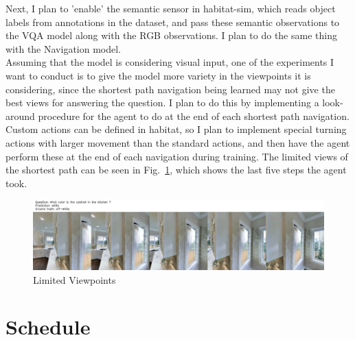 \documentclass{article}
\begin{document}
Next, I plan to 'enable' the semantic sensor in habitat-sim, which reads object labels from annotations in the dataset, and pass these semantic observations to the VQA model along with the RGB observations. I plan to do the same thing with the Navigation model. \\
Assuming that the model is considering visual input, one of the experiments I want to conduct is to give the model more variety in the viewpoints it is considering, since the shortest path navigation being learned may not give the best views for answering the question\cite{blindfolded}. I plan to do this by implementing a look-around procedure for the agent to do at the end of each shortest path navigation. Custom actions can be defined in habitat, so I plan to implement special turning actions with larger movement than the standard actions, and then have the agent perform these at the end of each navigation during training. The limited views of the shortest path can be seen in Fig.~\ref{fig:viewpoints}, which shows the last five steps the agent took. 


\begin{figure}[h]
	\centering
	\includegraphics[width=\textwidth]{ckpt_0_1093_image.jpg}
	\caption{Limited Viewpoints}
	\label{fig:viewpoints}
\end{figure}


\section{Schedule}
\end{document}
